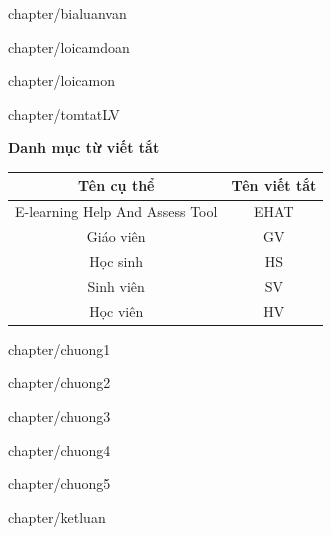 \documentclass[12pt, a4paper, reqno, oneside]{report}
\begin{document}
	\makeatletter
	\renewcommand{\ps@myheadings}{
		\renewcommand{\@oddhead}{\textsf{Luận văn tốt nghiệp - công nghệ thông tin}\hfil\textrm{\thepage}}
		\renewcommand{\@oddfoot}{\textsf{Phan Minh Cường, Khoa Khoa học \& Kỹ thuật máy tính}\hfil}
	}
	
	\newpage
	 {chapter/bialuanvan}
	
	\newpage
	 {chapter/loicamdoan}
	
	\newpage
	 {chapter/loicamon}
	
	\newpage
	 {chapter/tomtatLV}
	
	\newpage
	\tableofcontents
	
	\newpage
	{\huge\bf Danh mục từ viết tắt} 
	
	\begin{center}
		\begin{table}[!htp]
			\centering
			\begin{tabular}{|c|c|}
				\hline 
				Tên cụ thể & Tên viết tắt \\ 
				\hline 
				E-learning Help And Assess Tool & EHAT \\ 
				\hline 
				Giáo viên & GV \\ 
				\hline 
				Học sinh & HS \\ 
				\hline 
				Sinh viên & SV \\ 
				\hline 
				Học viên & HV \\ 
				\hline 
			\end{tabular}
			\label{bang}
		\end{table}
	\end{center}
	
	\newpage
	\listoftables
	
	\newpage
	\listoffigures

	\newpage
	 {chapter/chuong1}
	
	\newpage
	 {chapter/chuong2}
	
	\newpage
	 {chapter/chuong3}
	
	\newpage
	 {chapter/chuong4}
	
	\newpage
	 {chapter/chuong5}
	
	\newpage
	 {chapter/ketluan}
	
	\clearpage
	\printbibliography
	
	\clearpage
	
	
\end{document}
